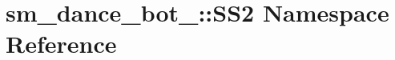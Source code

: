 \hypertarget{namespacesm__dance__bot__2_1_1SS2}{}\section{sm\+\_\+dance\+\_\+bot\+\_\+:\+:S\+S2 Namespace Reference}
\label{namespacesm__dance__bot__2_1_1SS2}
